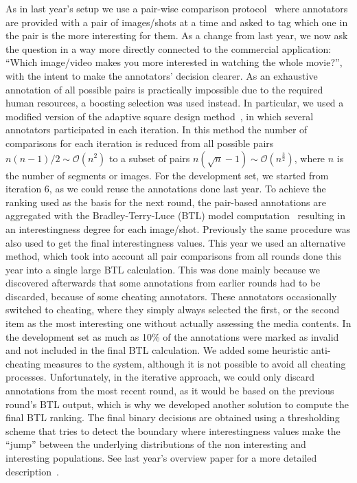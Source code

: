 \documentclass[sigconf]{acmart-me}
\begin{document}

As in last year's setup we use a pair-wise comparison protocol~\cite{Bradley} where annotators are provided with a pair of images/shots at a time and asked to tag which one in the pair is the more interesting for them.
As a change from last year, we now ask the question in a way more directly connected to the commercial application: ``Which image/video makes you more interested in watching the whole movie?'', with the intent to make the annotators' decision clearer.
As an exhaustive annotation of all possible pairs is practically impossible due to the required human resources, a boosting selection was used instead.
In particular, we used a modified version of the adaptive square design method~\cite{Li-SPIE2013}, in which several annotators participated in each iteration.  
In this method the number of comparisons for each iteration is reduced from all possible pairs $n(n-1)/2 \sim \mathcal{O}(n^2)$ to a subset of pairs $n(\sqrt{n}-1) \sim \mathcal{O}(n^{\frac{3}{2}})$, where $n$ is the number of segments or images.
For the development set, we started from iteration 6, as we could reuse the annotations done last year.
To achieve the ranking used as the basis for the next round, the pair-based annotations are aggregated with the Bradley-Terry-Luce (BTL) model computation~\cite{Bradley} resulting in an interestingness degree for each image/shot.
Previously the same procedure was also used to get the final interestingness values.
This year we used an alternative method, which took into account all pair comparisons from all rounds done this year into a single large BTL calculation.
This was done mainly because we discovered afterwards that some annotations from earlier rounds had to be discarded, because of some cheating annotators. %
These annotators occasionally switched to cheating, where they simply always selected the first, or the second item as the most interesting one without actually assessing the media contents.
In the development set as much as 10\% of the annotations were marked as invalid and not included in the final BTL calculation. We added some heuristic anti-cheating measures to the system, although it is not possible to avoid all cheating processes.
Unfortunately, in the iterative approach, we could only discard annotations from the most recent round, as it would be based on the previous round's BTL output, which is why we developed another solution to compute the final BTL ranking.
The final binary decisions are obtained using a thresholding scheme that tries to detect the boundary where interestingness values make the ``jump'' between the underlying distributions of the non interesting and interesting populations.  See last year's overview paper for a more detailed description~\cite{demarty2016mediaeval}.
\end{document}
